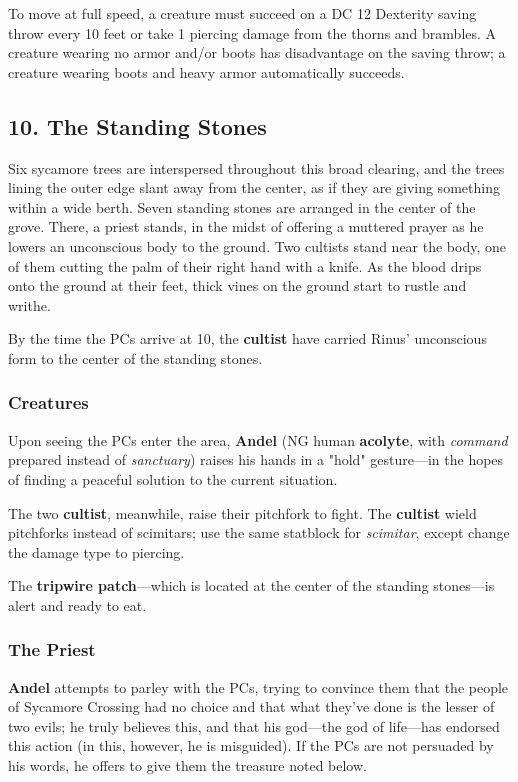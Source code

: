 \documentclass[10pt,a4paper,twoside,bg=print,twocolumn,openany,nodeprecatedcode]{dndbook}
\begin{document}
To move at full speed, a creature must succeed on a DC 12 Dexterity saving throw every 10 feet or take 1 piercing damage from the thorns and brambles. A creature wearing no armor and/or boots has disadvantage on the saving throw; a creature wearing boots and heavy armor automatically succeeds.

\subsection{10. The Standing Stones}
\begin{DndReadAloud}{}
Six sycamore trees are interspersed throughout this broad clearing, and the trees lining the outer edge slant away from the center, as if they are giving something within a wide berth. Seven standing stones are arranged in the center of the grove. There, a priest stands, in the midst of offering a muttered prayer as he lowers an unconscious body to the ground. Two cultists stand near the body, one of them cutting the palm of their right hand with a knife. As the blood drips onto the ground at their feet, thick vines on the ground start to rustle and writhe.

\end{DndReadAloud}

By the time the PCs arrive at 10, the \textbf{cultist} have carried Rinus' unconscious form to the center of the standing stones.

\subsubsection{Creatures}
Upon seeing the PCs enter the area, \textbf{Andel} (NG human \textbf{acolyte}, with \textit{command} prepared instead of \textit{sanctuary}) raises his hands in a "hold" gesture—in the hopes of finding a peaceful solution to the current situation.

The two \textbf{cultist}, meanwhile, raise their pitchfork to fight. The \textbf{cultist} wield pitchforks instead of scimitars; use the same statblock for \textit{scimitar}, except change the damage type to piercing.

The \textbf{tripwire patch}—which is located at the center of the standing stones—is alert and ready to eat.

\subsubsection{The Priest}
\textbf{Andel} attempts to parley with the PCs, trying to convince them that the people of Sycamore Crossing had no choice and that what they've done is the lesser of two evils; he truly believes this, and that his god—the god of life—has endorsed this action (in this, however, he is misguided). If the PCs are not persuaded by his words, he offers to give them the treasure noted below.
\end{document}
